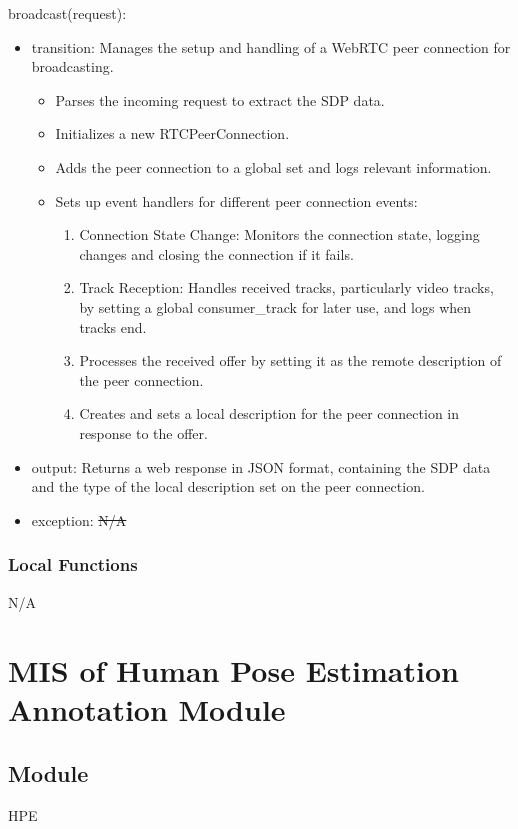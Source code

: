 \documentclass[12pt, titlepage]{article}
\newcommand{\rt}[1]{\textcolor{red}{#1}}
\begin{document}
\noindent broadcast(request):
\begin{itemize}
\item transition: Manages the setup and handling of a WebRTC peer connection for
  broadcasting.

  \begin{itemize}
  \item Parses the incoming request to extract the SDP data.
  \item Initializes a new RTCPeerConnection.
  \item Adds the peer connection to a global set and logs relevant information.
  \item Sets up event handlers for different peer connection events:
    \begin{enumerate}
    \item Connection State Change: Monitors the connection state, logging changes
      and closing the connection if it fails.
    \item Track Reception: Handles received tracks, particularly video tracks, by
      setting a global consumer\_track for later use, and logs when tracks end.
    \item Processes the received offer by setting it as the remote description of
      the peer connection.
    \item Creates and sets a local description for the peer connection in response
      to the offer.
    \end{enumerate}
  \end{itemize}
\item output: Returns a web response in JSON format, containing the SDP data and
  the type of the local description set on the peer connection.
\item exception: \sout{N/A} \rt{}
\end{itemize}

\subsubsection{Local Functions}
N/A

\section{MIS of Human Pose Estimation Annotation Module} \label{sec:hpe}

\subsection{Module}
HPE
\end{document}
